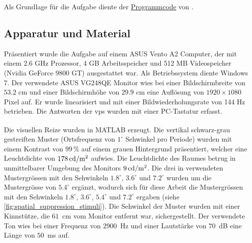 \documentclass[11pt, twoside, a4paper]{book}		%
\begin{document}
Als Grundlage für die Aufgabe diente der \href{http://www2.bcs.rochester.edu/sites/duje/SuppressionCode.zip}{Programmcode} von \citet{Melnick2013}.

\subsection{Apparatur und Material \label{sub:ssas}}
Präsentiert wurde die Aufgabe auf einem ASUS Vento A2 Computer, der mit einem 2.6 GHz Prozessor, 4 GB Arbeitsspeicher und 512 MB Videospeicher (Nvidia GeForce 9800 GT) ausgestattet war. Als Betriebssystem diente Windows 7. Der verwendete ASUS VG248QE Monitor wies bei einer Bildschirmbreite von $53.2$ cm und einer Bildschirmhöhe von $29.9$ cm eine Auflösung von $1920 \times 1080$ Pixel auf. Er wurde linearisiert und mit einer Bildwiederholungsrate von 144 Hz betrieben. Die Antworten der \glspl{vp} wurden mit einer PC-Tastatur erfasst. 

Die visuellen Reize wurden in MATLAB\textsuperscript{\textregistered} \citep{matlab} erzeugt. Die vertikal schwarz-grau gestreiften Muster (Ortsfrequenz von $1^{\circ}$ Sehwinkel pro Periode) wurden mit einem Kontrast von $99\,\%$ auf einem grauen Hintergrund präsentiert, welcher eine Leuchtdichte von $178\,\textnormal{cd}/ \textnormal{m}^2$ aufwies. Die Leuchtdichte des Raumes betrug in unmittelbarer Umgebung des Monitors $9\,\textnormal{cd}/ \textnormal{m}^2$. Die drei in \citet{Melnick2013} verwendeten Mustergrössen mit den Sehwinkeln  $1.8^{\circ}$, $3.6^{\circ}$ und $7.2^{\circ}$ wurden um die Mustergrösse von $5.4^{\circ}$ ergänzt, wodurch sich für diese Arbeit die Mustergrössen mit den Sehwinkeln $1.8^{\circ}$, $3.6^{\circ}$, $5.4^{\circ}$ und $7.2^{\circ}$ ergaben (siehe \autoref{fig:spatial_suppression_stimuli}). 
Die Sehwinkel der Muster wurden mit einer Kinnstütze, die $61$~cm vom Monitor entfernt war, sichergestellt. 
Der verwendete Ton wies bei einer Frequenz von $2900$~Hz und einer Lautstärke von $70$~dB eine Länge von $50$~ms auf.

%
%
\end{document}
